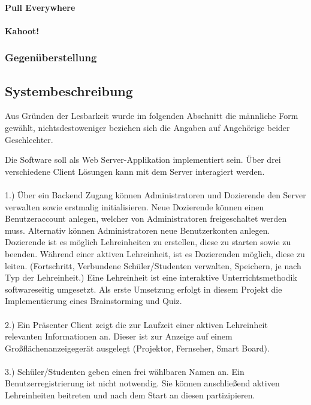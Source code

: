 \paragraph{Pull Everywhere}
\paragraph{Kahoot!}
\subsubsection{Gegenüberstellung}\label{sec:gegenstellung}
\subsection{Systembeschreibung}\label{sec:sysbeschreib}
Aus Gründen der Lesbarkeit wurde im folgenden Abschnitt die männliche Form gewählt, nichtsdestoweniger beziehen sich die Angaben auf Angehörige beider Geschlechter. 

Die Software soll als Web Server-Applikation implementiert sein. Über drei verschiedene Client Lösungen kann mit dem Server interagiert werden. \\ \\

1.) Über ein Backend Zugang können Administratoren und Dozierende den Server verwalten sowie erstmalig initialisieren. Neue Dozierende können einen Benutzeraccount anlegen, welcher von Administratoren freigeschaltet werden muss. Alternativ können Administratoren neue Benutzerkonten anlegen. Dozierende ist es möglich Lehreinheiten zu erstellen, diese zu starten sowie zu beenden. Während einer aktiven Lehreinheit, ist es Dozierenden möglich, diese zu leiten. (Fortschritt, Verbundene Schüler/Studenten verwalten, Speichern, je nach Typ der Lehreinheit.) Eine Lehreinheit ist eine interaktive Unterrichtsmethodik softwareseitig umgesetzt. Als erste Umsetzung erfolgt in diesem Projekt die Implementierung eines Brainstorming und Quiz. \\ \\

2.) Ein Präsenter Client zeigt die zur Laufzeit einer aktiven Lehreinheit relevanten Informationen an. Dieser ist zur Anzeige auf einem Großflächenanzeigegerät ausgelegt (Projektor, Fernseher, Smart Board). \\ \\
3.) Schüler/Studenten geben einen frei wählbaren Namen an. Ein Benutzerregistrierung ist nicht notwendig. Sie können anschließend aktiven Lehreinheiten beitreten und nach dem Start an diesen partizipieren. \\ \\


